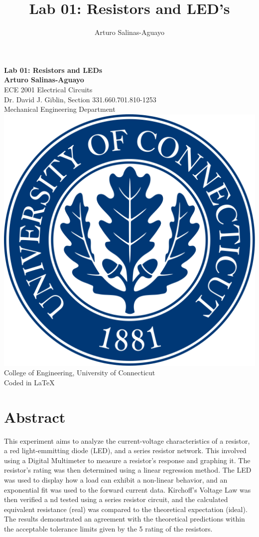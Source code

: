 \documentclass[12pt]{article}
\author{Arturo Salinas-Aguayo}
\title{Lab 01: Resistors and LED's}
\begin{document}
\newcommand{\closure}[2][3]{%
	{}\mkern#1mu\overline{\mkern-#1mu#2}}
\newcommand\ncoverline[1]{\mkern1mu\overline{\mkern-1mu#1\mkern-1mu}\mkern1mu}
\begin{titlepage}
	\centering
	\vspace*{3cm}
	\huge\textbf{Lab 01: Resistors and LEDs}\\
	\vspace{5cm}
	\Large\textbf{Arturo Salinas-Aguayo}\\
	\normalsize
	ECE 2001 Electrical Circuits\\
	Dr. David J. Giblin, Section 331.660.701.810-1253\\
	Mechanical Engineering Department
	\vfill
	\includegraphics[scale=0.1]{uconnlogo}\\
	College of Engineering, University of Connecticut\\
	\scriptsize{Coded in \LaTeX}
	\vspace*{1cm}
\end{titlepage}
\tableofcontents
\newpage
\section{Abstract}
This experiment aims to analyze the current-voltage characteristics of a
resistor, a red light-emmitting diode (LED), and a series resistor network.
This involved using a Digital Multimeter to measure a resistor's response and
graphing it. The resistor's rating was then determined using a linear regression
method. The LED was used to display how a load can exhibit a non-linear
behavior, and an exponential fit was used to the forward current data.
Kirchoff's Voltage Law was then verified a nd tested using a series resistor
circuit, and the calculated equivalent resistance (real) was compared to the
theoretical expectation (ideal). The results demonstrated an agreement with the
theoretical predictions within the acceptable tolerance limits given by the 5%
rating of the resistors.
\newpage
\end{document}
